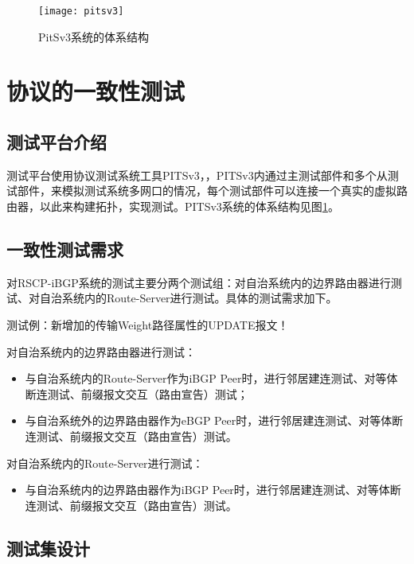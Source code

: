 \begin{figure}
  \centering
  \texttt{[image: pitsv3]}
  \caption{PitSv3系统的体系结构\cite{pitsv3}}
  \label{fig:pitsv3}
\end{figure}


\section{协议的一致性测试}
\subsection{测试平台介绍}
测试平台使用协议测试系统工具PITSv3，，PITSv3内通过主测试部件和多个从测试部件，来模拟测试系统多网口的情况，每个测试部件可以连接一个真实的虚拟路由器，以此来构建拓扑，实现测试。PITSv3系统的体系结构见图\ref{fig:pitsv3}。
\subsection{一致性测试需求}

对RSCP-iBGP系统的测试主要分两个测试组：对自治系统内的边界路由器进行测试、对自治系统内的Route-Server进行测试。具体的测试需求加下。

测试例：新增加的传输Weight路径属性的UPDATE报文！


对自治系统内的边界路由器进行测试：
\begin{itemize}
  \item 与自治系统内的Route-Server作为iBGP Peer时，进行邻居建连测试、对等体断连测试、前缀报文交互（路由宣告）测试；
  \item 与自治系统外的边界路由器作为eBGP Peer时，进行邻居建连测试、对等体断连测试、前缀报文交互（路由宣告）测试。
\end{itemize}

对自治系统内的Route-Server进行测试：
\begin{itemize}
  \item 与自治系统内的边界路由器作为iBGP Peer时，进行邻居建连测试、对等体断连测试、前缀报文交互（路由宣告）测试。
\end{itemize}




\subsection{测试集设计}

